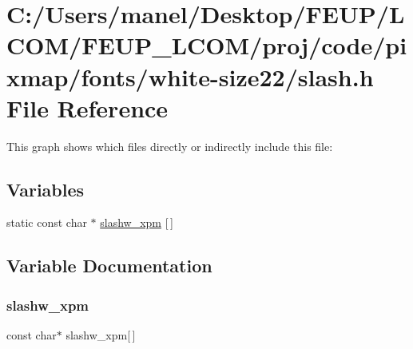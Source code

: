 \hypertarget{white-size22_2slash_8h}{}\section{C\+:/\+Users/manel/\+Desktop/\+F\+E\+U\+P/\+L\+C\+O\+M/\+F\+E\+U\+P\+\_\+\+L\+C\+O\+M/proj/code/pixmap/fonts/white-\/size22/slash.h File Reference}
\label{white-size22_2slash_8h}
This graph shows which files directly or indirectly include this file\+:
\subsection*{Variables}
\begin{DoxyCompactItemize}
\item 
static const char $\ast$ \mbox{\hyperlink{white-size22_2slash_8h_ad099df0b7ca09f7cd96aa479efa03d53}{slashw\+\_\+xpm}} \mbox{[}$\,$\mbox{]}
\end{DoxyCompactItemize}


\subsection{Variable Documentation}
\mbox{\label{white-size22_2slash_8h_ad099df0b7ca09f7cd96aa479efa03d53}} 
\subsubsection{\texorpdfstring{slashw\_xpm}{slashw\_xpm}}
{\footnotesize\ttfamily const char$\ast$ slashw\+\_\+xpm\mbox{[}$\,$\mbox{]}\hspace{0.3cm}{\ttfamily [static]}}


